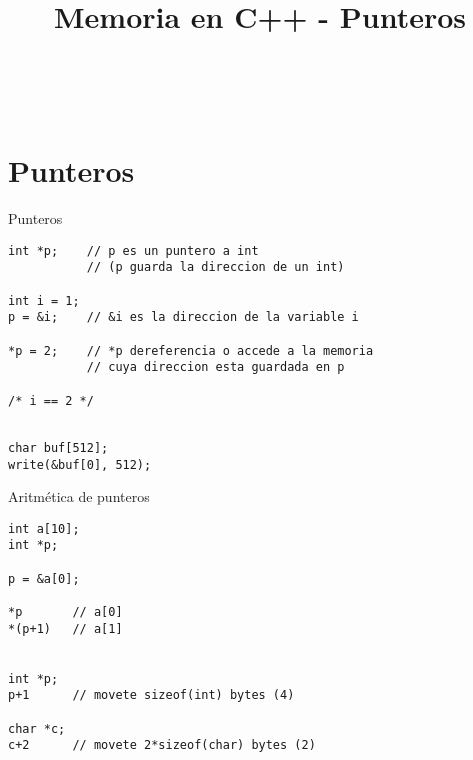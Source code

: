 

\title%
{Memoria en C++ - Punteros}


\subject{Memoria en C++ - Punteros}




\begin{frame}
   \titlepage
\end{frame}


~%
\section{Punteros}
\begin{frame}[fragile]{Punteros}
         \begin{lstlisting}[style=normal]
int *p;    // p es un puntero a int
           // (p guarda la direccion de un int)

int i = 1;
p = &i;    // &i es la direccion de la variable i

*p = 2;    // *p dereferencia o accede a la memoria
           // cuya direccion esta guardada en p

/* i == 2 */

         \end{lstlisting}
         \begin{lstlisting}[style=normal]

char buf[512];
write(&buf[0], 512);

         \end{lstlisting}
\end{frame}

\begin{frame}[fragile]{Aritm\'etica de punteros}
         \begin{lstlisting}[style=normal]
int a[10];
int *p;

p = &a[0];

*p       // a[0]
*(p+1)   // a[1]


int *p;
p+1      // movete sizeof(int) bytes (4)

char *c;
c+2      // movete 2*sizeof(char) bytes (2)

         \end{lstlisting}
\end{frame}

